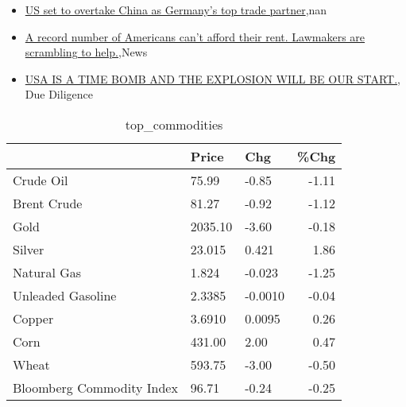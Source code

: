 \documentclass{article}%
\begin{document}
\begin{itemize}
\item%
\href{https://reddit.com/r/Economics/comments/1aoi9gc/us\_set\_to\_overtake\_china\_as\_germanys\_top\_trade/}{US set to overtake China as Germany's top trade partner},nan%
\item%
\href{https://reddit.com/r/Economics/comments/1aoh248/a\_record\_number\_of\_americans\_cant\_afford\_their/}{A record number of Americans can't afford their rent. Lawmakers are scrambling to help.},News%
\item%
\href{https://reddit.com/r/Superstonk/comments/1aokrnk/usa\_is\_a\_time\_bomb\_and\_the\_explosion\_will\_be\_our/}{USA IS A TIME BOMB AND THE EXPLOSION WILL BE OUR START.}, Due Diligence%
\end{itemize}%


\begin{table}[htbp]%
\caption{top\_commodities}%
\centering%
\begin{adjustbox}{width=1\textwidth}%
\begin{tabular}{lllr}
\toprule
                          &   Price &     Chg &  \%Chg \\
\midrule
               Crude Oil  &   75.99 &   -0.85 & -1.11 \\
             Brent Crude  &   81.27 &   -0.92 & -1.12 \\
                    Gold  & 2035.10 &   -3.60 & -0.18 \\
                  Silver  &  23.015 &   0.421 &  1.86 \\
             Natural Gas  &   1.824 &  -0.023 & -1.25 \\
       Unleaded Gasoline  &  2.3385 & -0.0010 & -0.04 \\
                  Copper  &  3.6910 &  0.0095 &  0.26 \\
                    Corn  &  431.00 &    2.00 &  0.47 \\
                   Wheat  &  593.75 &   -3.00 & -0.50 \\
Bloomberg Commodity Index &   96.71 &   -0.24 & -0.25 \\
\bottomrule
\end{tabular}
%
\end{adjustbox}%
\end{table}

%
\end{document}
